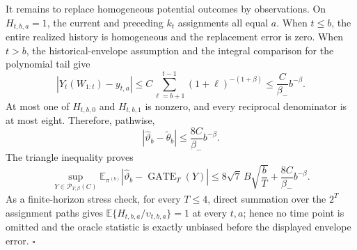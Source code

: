 It remains to replace homogeneous potential outcomes by observations. On \(H_{t,b,a}=1\), the current and preceding \(k_t\) assignments all equal \(a\). When \(t\le b\), the entire realized history is homogeneous and the replacement error is zero. When \(t>b\), the historical-envelope assumption and the integral comparison for the polynomial tail give
\[
\left\lvert Y_t(W_{1:t})-y_{t,a}\right\rvert
\le C\sum_{\ell=b+1}^{t-1}(1+\ell)^{-(1+\beta)}
\le\frac{C}{\beta_-}b^{-\beta}.
\]
At most one of \(H_{t,b,0}\) and \(H_{t,b,1}\) is nonzero, and every reciprocal denominator is at most eight. Therefore, pathwise,
\[
\left\lvert\widehat\vartheta_b-\widetilde\theta_b\right\rvert
\le\frac{8C}{\beta_-}b^{-\beta}.
\]
The triangle inequality proves
\[
\sup_{Y\in\mathcal P_{T,\beta}(C)}\mathbb E_{\pi^{(b)}}\left\lvert\widehat\vartheta_b-\operatorname{GATE}_T(Y)\right\rvert
\le8\sqrt7\,B\sqrt{\frac bT}+\frac{8C}{\beta_-}b^{-\beta}.
\]
As a finite-horizon stress check, for every \(T\le4\), direct summation over the \(2^T\) assignment paths gives \(\mathbb E\{H_{t,b,a}/\upsilon_{t,b,a}\}=1\) at every \(t,a\); hence no time point is omitted and the oracle statistic is exactly unbiased before the displayed envelope error. \(\square\)